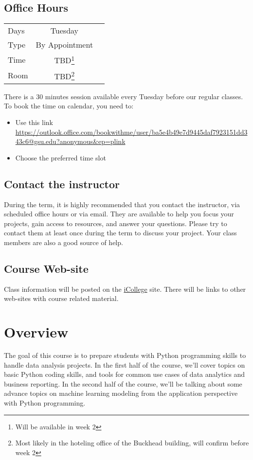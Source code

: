 \documentclass{article}
\begin{document}
\subsection{Office Hours}
\begin{center}
  \begin{tabular}{ l | c r }
    \hline			
    Days & Tuesday\\
    Type & By Appointment\\
    Time & TBD\footnote{Will be available in week 2} \\
    Room & TBD\footnote{Most likely in the hoteling office of the Buckhead building, will confirm before week 2}\\
    \hline  
  \end{tabular}
\end{center}
\begin{flushleft}
There is a 30 minutes session available every Tuesday before our regular classes. To book the time on calendar, you need to:
  \begin{itemize}
    \item Use this link \url{https://outlook.office.com/bookwithme/user/ba5e4b49e7d9445daf7923151dd343c6@gsu.edu?anonymous&ep=plink}
    \item Choose the preferred time slot
  \end{itemize}
\end{flushleft}


\subsection{Contact the instructor}
During the term, it is highly recommended that you contact the instructor, via scheduled office hours or via email. They are available to help you focus your projects, gain access to resources, and answer your questions. Please try to contact them at least once during the term to discuss your project. Your class members are also a good source of help.


\subsection{Course Web-site}
Class information will be posted on the \href{https://icollege.gsu.edu/}{iCollege} site. There will be links to other web-sites with course related material.


\section{Overview}
The goal of this course is to prepare students with Python programming skills to handle data analysis projects. In the first half of the course, we'll cover topics on basic Python coding skills, and tools for common use cases of data analytics and business reporting. In the second half of the course, we'll be talking about some advance topics on machine learning modeling from the application perspective with Python programming.
\end{document}
